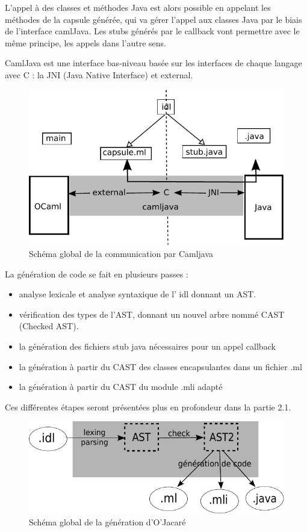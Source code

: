 \documentclass[a4paper, 11pt, notitlepage]{article}
\begin{document}
L'appel à des classes et méthodes Java est alors possible en appelant
les méthodes de la capsule générée, qui va gérer l'appel aux classes
Java par le biais de l'interface camlJava.
Les stubs générés par le callback vont permettre avec le même
principe, les appels dans l'autre sens.

CamlJava est une interface bas-niveau basée sur les interfaces de chaque langage avec C : la JNI (Java Native Interface) et external.

\begin{figure}[h]
  \centering
  \includegraphics{schemaCamljava2.pdf}
  \caption{Schéma global de la communication par Camljava}
\end{figure}

La génération de code se fait en plusieurs passes :
\begin{itemize}
\item analyse lexicale et analyse syntaxique de l' idl donnant un AST.
\item vérification des types de l'AST, donnant un nouvel arbre nommé
  CAST (Checked AST).
\item la génération des fichiers stub java nécessaires pour un appel callback 
\item la génération à partir du CAST des classes encapsulantes dans un fichier .ml
\item la génération à partir du CAST du module .mli adapté
\end{itemize}
Ces différentes étapes seront présentées plus en profondeur dans la
partie 2.1.

\begin{figure}[h]
  \centering
  \includegraphics{schemaOjacare.pdf}
  \caption{Schéma global de la génération d'O'Jacaré}
\end{figure}
\end{document}
